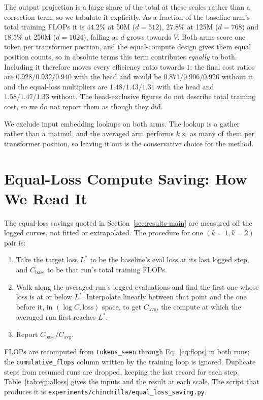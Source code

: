 \documentclass[11pt]{article}
\begin{document}
The output projection is a large share of the total at these scales rather than
a correction term, so we tabulate it explicitly. As a fraction of the baseline
arm's total training FLOPs it is $44.2\%$ at 50M ($d{=}512$), $27.8\%$ at 125M
($d{=}768$) and $18.5\%$ at 250M ($d{=}1024$), falling as $d$ grows towards $V$.
Both arms score one token per transformer position, and the equal-compute design
gives them equal position counts, so in absolute terms this term contributes
\emph{equally} to both. Including it therefore moves every efficiency ratio
towards $1$: the final cost ratios are $0.928/0.932/0.940$ with the head and
would be $0.871/0.906/0.926$ without it, and the equal-loss multipliers are
$1.48/1.43/1.31$ with the head and $1.58/1.47/1.33$ without. The
head-exclusive figures do not describe total training cost, so we do not report
them as though they did.

We exclude input embedding lookups on both arms. The lookup is a gather rather
than a matmul, and the averaged arm performs $k\times$ as many of them per
transformer position, so leaving it out is the conservative choice for the
method.

\section{Equal-Loss Compute Saving: How We Read It}
\label{app:equalloss}

The equal-loss savings quoted in Section~\ref{sec:results-main} are measured
off the logged curves, not fitted or extrapolated. The procedure for one
$(k{=}1, k{=}2)$ pair is:

\begin{enumerate}
  \item Take the target loss $L^\ast$ to be the baseline's eval loss at its
        last logged step, and $C_{\mathrm{base}}$ to be that run's total
        training FLOPs.
  \item Walk along the averaged run's logged evaluations and find the first
        one whose loss is at or below $L^\ast$. Interpolate linearly between
        that point and the one before it, in $(\log C, \text{loss})$ space, to
        get $C_{\mathrm{avg}}$, the compute at which the averaged run first
        reaches $L^\ast$.
  \item Report $C_{\mathrm{base}} / C_{\mathrm{avg}}$.
\end{enumerate}

FLOPs are recomputed from \texttt{tokens\_seen} through Eq.~\eqref{eq:flops}
in both runs; the \texttt{cumulative\_flops} column written by the training
loop is ignored. Duplicate steps from resumed runs are dropped, keeping the
last record for each step. Table~\ref{tab:equalloss} gives the inputs and the
result at each scale. The script that produces it is
\texttt{experiments/chinchilla/equal\_loss\_saving.py}.
\end{document}
